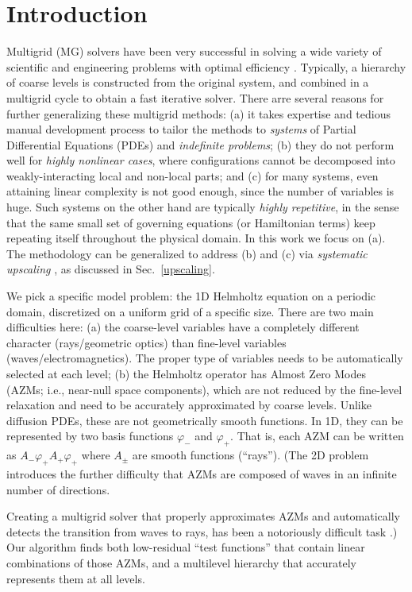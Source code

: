 \documentclass{article}
\begin{document}
\section{Introduction}
\label{intro}
Multigrid (MG) solvers have been very successful in solving a wide variety of scientific and engineering problems with optimal efficiency \cite{review}. Typically, a hierarchy of coarse levels is constructed from the original system, and combined in a multigrid cycle to obtain a fast iterative solver. There arre several reasons for further generalizing these multigrid methods: (a) it takes expertise and tedious manual development process to tailor the methods to \emph{systems} of Partial Differential Equations (PDEs) and \emph{indefinite problems}; (b) they do not perform well for \emph{highly nonlinear cases}, where configurations cannot be decomposed into weakly-interacting local and non-local parts; and (c) for many systems, even attaining linear complexity is not good enough, since the number of variables is huge. Such systems on the other hand are typically \emph{highly repetitive}, in the sense that the same small set of governing equations (or Hamiltonian terms) keep repeating itself throughout the physical domain. In this work we focus on (a).  The methodology can be generalized to address (b) and (c) via \emph{systematic upscaling} \cite{su}, as discussed in Sec.~\ref{upscaling}.

We pick a specific model problem: the 1D Helmholtz equation on a periodic domain, discretized on a uniform grid of a specific size. There are two main difficulties here: (a) the coarse-level variables have a completely different character (rays/geometric optics) than fine-level variables (waves/electromagnetics). The proper type of variables needs to be automatically selected at each level; (b) the Helmholtz operator has Almost Zero Modes (AZMs; i.e., near-null space components), which are not reduced by the fine-level relaxation and need to be accurately approximated by coarse levels. Unlike diffusion PDEs, these are not geometrically smooth functions. In 1D, they can be represented by two basis functions $\varphi_-$ and $\varphi_+$. That is, each AZM can be written as $A_- \varphi_+ A_+ \varphi_+$ where $A_{\pm}$ are smooth functions (``rays''). (The 2D problem introduces the further difficulty that AZMs are composed of waves in an infinite number of directions. 

Creating a multigrid solver that properly approximates AZMs and automatically detects the transition from waves to rays, has been a notoriously difficult task \cite{wave_ray, later_papers}.) Our algorithm finds both low-residual ``test functions'' that contain linear combinations of those AZMs, and a multilevel hierarchy that accurately represents them at all levels.
\end{document}
